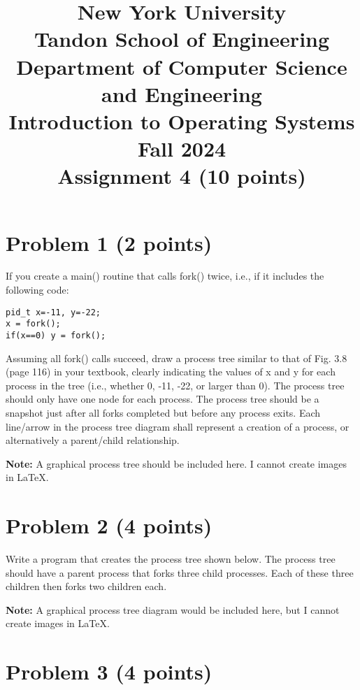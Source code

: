 \documentclass{article}
\begin{document}
\title{New York University \\ Tandon School of Engineering \\ Department of Computer Science and Engineering \\ Introduction to Operating Systems \\ Fall 2024 \\ Assignment 4 (10 points)}
\date{}
\maketitle

\section*{Problem 1 (2 points)}

If you create a main() routine that calls fork() twice, i.e., if it includes the following code:

\begin{verbatim}
pid_t x=-11, y=-22;
x = fork();
if(x==0) y = fork();
\end{verbatim}

Assuming all fork() calls succeed, draw a process tree similar to that of Fig. 3.8 (page 116) in your textbook, clearly indicating the values of x and y for each process in the tree (i.e., whether 0, -11, -22, or larger than 0). The process tree should only have one node for each process. The process tree should be a snapshot just after all forks completed but before any process exits. Each line/arrow in the process tree diagram shall represent a creation of a process, or alternatively a parent/child relationship.

\textbf{Note:} A graphical process tree should be included here. I cannot create images in LaTeX.


\section*{Problem 2 (4 points)}

Write a program that creates the process tree shown below.  The process tree should have a parent process that forks three child processes. Each of these three children then forks two children each.

\textbf{Note:} A graphical process tree diagram would be included here, but I cannot create images in LaTeX.


\section*{Problem 3 (4 points)}
\end{document}
